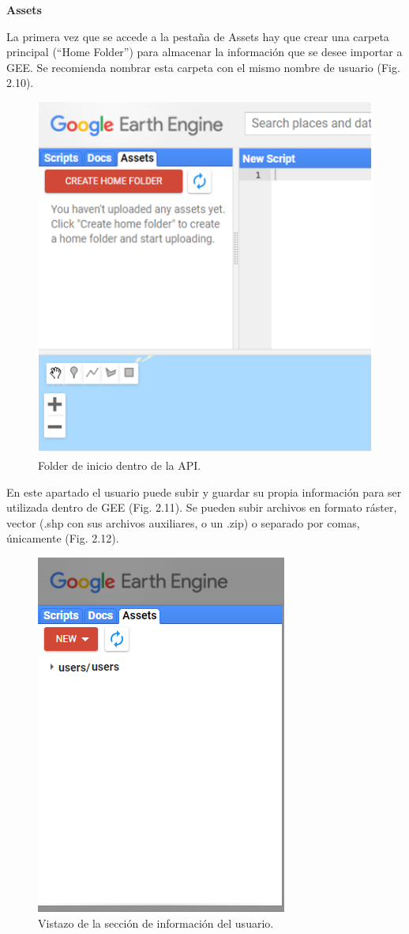 \documentclass[
  12pt,
  letterpaper,
  twoside]{book}
\begin{document}
\textbf{Assets}

La primera vez que se accede a la pestaña de Assets hay que crear una carpeta principal (``Home Folder'') para almacenar la información que se desee importar a GEE. Se recomienda nombrar esta carpeta con el mismo nombre de usuario (Fig. 2.10).

\begin{figure}[btp]

{\centering \includegraphics[width=0.6\linewidth]{Img/homeFolder} 

}

\caption{Folder de inicio dentro de la API.}\label{fig:unnamed-chunk-11}
\end{figure}

En este apartado el usuario puede subir y guardar su propia información para ser utilizada dentro de GEE (Fig. 2.11). Se pueden subir archivos en formato ráster, vector (.shp con sus archivos auxiliares, o un .zip) o separado por comas, únicamente (Fig. 2.12).

\begin{figure}[btp]

{\centering \includegraphics[width=0.4\linewidth]{Img/assets} 

}

\caption{Vistazo de la sección de información del usuario.}\label{fig:unnamed-chunk-12}
\end{figure}
\end{document}
